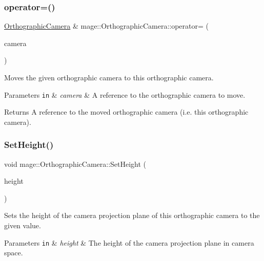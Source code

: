 \subsubsection{\texorpdfstring{operator=()}{operator=()}\hspace{0.1cm}{\footnotesize\ttfamily [2/2]}}
{\footnotesize\ttfamily \hyperlink{classmage_1_1_orthographic_camera}{Orthographic\+Camera} \& mage\+::\+Orthographic\+Camera\+::operator= (\begin{DoxyParamCaption}\item[{\hyperlink{classmage_1_1_orthographic_camera}{Orthographic\+Camera} \&\&}]{camera }\end{DoxyParamCaption})\hspace{0.3cm}{\ttfamily [default]}}

Moves the given orthographic camera to this orthographic camera.


\begin{DoxyParams}[1]{Parameters}
\mbox{\tt in}  & {\em camera} & A reference to the orthographic camera to move. \\
\hline
\end{DoxyParams}
\begin{DoxyReturn}{Returns}
A reference to the moved orthographic camera (i.\+e. this orthographic camera). 
\end{DoxyReturn}
\hypertarget{classmage_1_1_orthographic_camera_ac27c98097ed9d53d91729033de629f7e}{}\label{classmage_1_1_orthographic_camera_ac27c98097ed9d53d91729033de629f7e} 
\subsubsection{\texorpdfstring{Set\+Height()}{SetHeight()}}
{\footnotesize\ttfamily void mage\+::\+Orthographic\+Camera\+::\+Set\+Height (\begin{DoxyParamCaption}\item[{\hyperlink{namespacemage_a6a44ad388483959dc4dff9f2aef91431}{f32}}]{height }\end{DoxyParamCaption})\hspace{0.3cm}{\ttfamily [noexcept]}}

Sets the height of the camera projection plane of this orthographic camera to the given value.


\begin{DoxyParams}[1]{Parameters}
\mbox{\tt in}  & {\em height} & The height of the camera projection plane in camera space. \\
\hline
\end{DoxyParams}
\hypertarget{classmage_1_1_orthographic_camera_a172b31e05b7f1aebaba1c833e82fc119}{}\label{classmage_1_1_orthographic_camera_a172b31e05b7f1aebaba1c833e82fc119} 
